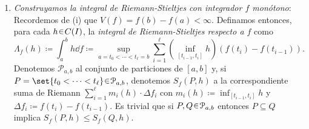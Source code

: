 \begin{sol}
\begin{enumerate}[label=(\roman*),leftmargin=1.8em]
\item %
\emph{Construyamos la integral de Riemann-Stieltjes con integrador $f$ monótono}:\\
Recordemos de (i) que $V(f) = f(b)-f(a)<\infty$. Definamos entonces, para cada $h\en C(I)$, la \emph{integral de Riemann-Stieltjes respecto a $f$} como
\[
\Lambda_f(h) \coloneq \int_a^b h \dd{f} \coloneq \sup_{a=t_0 <\cdots < t_\ell = b} \sum_{i=1}^\ell \left( \inf_{[t_{i-1}, t_i]} h \right) (f(t_i) - f(t_{i-1})).
\]
Denotemos $\mathcal{P}_{a,b}$ al conjunto de particiones de $[a,b]$ y, si $P=\set{t_0<\cdots<t_\ell}\en\mathcal{P}_{a,b}$, denotemos $S_f(P,h)$ a la correspondiente suma de Riemann $\sum^\ell_{i=1} m_i(h)\cdot \Delta f_i$ con $m_i(h) \coloneq \inf_{[t_{i-1}, t_i]} h$ y $\Delta f_i \coloneq f(t_i) - f(t_{i-1})$. Es trivial que si $P,Q\en\mathcal{P}_{a,b}$ entonces $P\subseteq Q$ implica $S_f(P,h) \leq S_f(Q,h)$.


\end{enumerate}
\end{sol}
